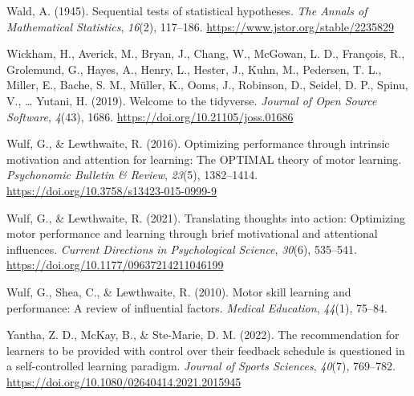 \documentclass[
  man, donotrepeattitle,floatsintext]{apa7}
\newlength{\cslhangindent}
\newlength{\cslentryspacingunit} %
\newenvironment{CSLReferences}[2] %
 {%
  \setlength{\parindent}{0pt}
  \ifodd #1
  \let\oldpar\par
  \def\par{\hangindent=\cslhangindent\oldpar}
  \fi
  \setlength{\parskip}{#2\cslentryspacingunit}
 }%
 {}
\begin{document}
\begin{CSLReferences}{1}{0}
\leavevmode{}%
Wald, A. (1945). Sequential tests of statistical hypotheses. \emph{The Annals of Mathematical Statistics}, \emph{16}(2), 117--186. \url{https://www.jstor.org/stable/2235829}

\leavevmode{}%
Wickham, H., Averick, M., Bryan, J., Chang, W., McGowan, L. D., François, R., Grolemund, G., Hayes, A., Henry, L., Hester, J., Kuhn, M., Pedersen, T. L., Miller, E., Bache, S. M., Müller, K., Ooms, J., Robinson, D., Seidel, D. P., Spinu, V., \ldots{} Yutani, H. (2019). Welcome to the {tidyverse}. \emph{Journal of Open Source Software}, \emph{4}(43), 1686. \url{https://doi.org/10.21105/joss.01686}

\leavevmode{}%
Wulf, G., \& Lewthwaite, R. (2016). Optimizing performance through intrinsic motivation and attention for learning: {The OPTIMAL} theory of motor learning. \emph{Psychonomic Bulletin \& Review}, \emph{23}(5), 1382--1414. \url{https://doi.org/10.3758/s13423-015-0999-9}

\leavevmode{}%
Wulf, G., \& Lewthwaite, R. (2021). Translating thoughts into action: Optimizing motor performance and learning through brief motivational and attentional influences. \emph{Current Directions in Psychological Science}, \emph{30}(6), 535--541. \url{https://doi.org/10.1177/09637214211046199}

\leavevmode{}%
Wulf, G., Shea, C., \& Lewthwaite, R. (2010). Motor skill learning and performance: A review of influential factors. \emph{Medical Education}, \emph{44}(1), 75--84.

\leavevmode{}%
Yantha, Z. D., McKay, B., \& Ste-Marie, D. M. (2022). The recommendation for learners to be provided with control over their feedback schedule is questioned in a self-controlled learning paradigm. \emph{Journal of Sports Sciences}, \emph{40}(7), 769--782. \url{https://doi.org/10.1080/02640414.2021.2015945}

\end{CSLReferences}
\end{document}
